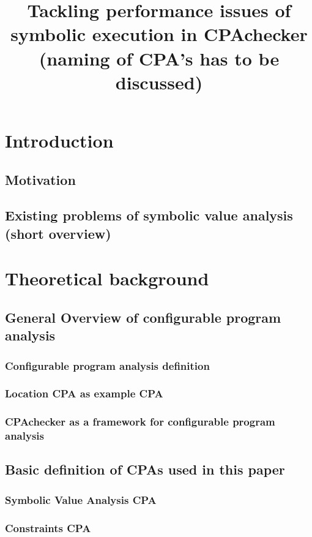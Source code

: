 \documentclass[a4paper,11pt]{article}
\begin{document}
\title{Tackling performance issues of symbolic execution in CPAchecker (naming of CPA's has to be discussed)}
\maketitle
\setcounter{tocdepth}{5}
\setcounter{secnumdepth}{5}
\tableofcontents

\section{Introduction}
\subsection{Motivation}
\subsection{Existing problems of symbolic value analysis (short overview)}

\section{Theoretical background}
\subsection{General Overview of configurable program analysis}
\subsubsection{Configurable program analysis definition}
\subsubsection{Location CPA as example CPA}
\subsubsection{CPAchecker as a framework for configurable program analysis}

\subsection{Basic definition of CPAs used in this paper}
\subsubsection{Symbolic Value Analysis CPA}
\subsubsection{Constraints CPA}
\end{document}
